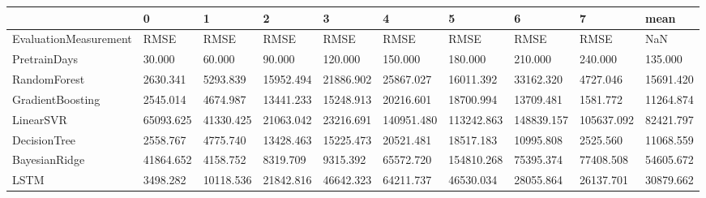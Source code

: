 \begin{tabular}{llllllllll}
\toprule
{} &         0 &         1 &         2 &         3 &          4 &          5 &          6 &          7 &      mean \\
\midrule
EvaluationMeasurement &      RMSE &      RMSE &      RMSE &      RMSE &       RMSE &       RMSE &       RMSE &       RMSE &       NaN \\
PretrainDays          &    30.000 &    60.000 &    90.000 &   120.000 &    150.000 &    180.000 &    210.000 &    240.000 &   135.000 \\
RandomForest          &  2630.341 &  5293.839 & 15952.494 & 21886.902 &  25867.027 &  16011.392 &  33162.320 &   4727.046 & 15691.420 \\
GradientBoosting      &  2545.014 &  4674.987 & 13441.233 & 15248.913 &  20216.601 &  18700.994 &  13709.481 &   1581.772 & 11264.874 \\
LinearSVR             & 65093.625 & 41330.425 & 21063.042 & 23216.691 & 140951.480 & 113242.863 & 148839.157 & 105637.092 & 82421.797 \\
DecisionTree          &  2558.767 &  4775.740 & 13428.463 & 15225.473 &  20521.481 &  18517.183 &  10995.808 &   2525.560 & 11068.559 \\
BayesianRidge         & 41864.652 &  4158.752 &  8319.709 &  9315.392 &  65572.720 & 154810.268 &  75395.374 &  77408.508 & 54605.672 \\
LSTM                  &  3498.282 & 10118.536 & 21842.816 & 46642.323 &  64211.737 &  46530.034 &  28055.864 &  26137.701 & 30879.662 \\
\bottomrule
\end{tabular}
